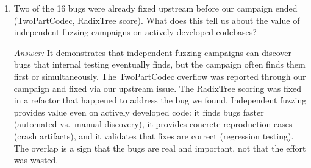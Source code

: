 \begin{enumerate}
  \emph{Answer:} ASAN is a whole-program instrumentation---it cannot be selectively disabled for individual functions without losing coverage for memory errors in those functions' callees. If a function wrapped in \texttt{catch\_unwind} calls code with a genuine memory error (e.g., an out-of-bounds read in an unsafe block), disabling ASAN would miss it. The workaround of filtering known-bug inputs at the harness level is imperfect but preserves ASAN's ability to detect real memory errors while avoiding false positives from expected panics.

  \item Two of the 16 bugs were already fixed upstream before our campaign ended (TwoPartCodec, RadixTree score). What does this tell us about the value of independent fuzzing campaigns on actively developed codebases?

  \emph{Answer:} It demonstrates that independent fuzzing campaigns can discover bugs that internal testing eventually finds, but the campaign often finds them first or simultaneously. The TwoPartCodec overflow was reported through our campaign and fixed via our upstream issue. The RadixTree scoring was fixed in a refactor that happened to address the bug we found. Independent fuzzing provides value even on actively developed code: it finds bugs faster (automated vs.\ manual discovery), it provides concrete reproduction cases (crash artifacts), and it validates that fixes are correct (regression testing). The overlap is a sign that the bugs are real and important, not that the effort was wasted.
\end{enumerate}
